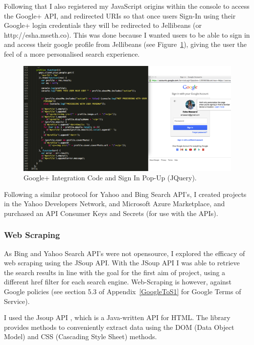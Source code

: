 \documentclass[a4paper, 11pt]{article}
\begin{document}
Following that I also registered my JavaScript origins within the console to access the Google+ API, and redirected URIs so that once users Sign-In using their Google+ login credentials they will be redirected to Jellibeans (or http://esha.mseth.co). This was done because I wanted users to be able to sign in and access their google profile from Jellibeans (see Figure~\ref{GoogleSignInPage}), giving the user the feel of a more personalised search experience. 

\begin{figure}[H]
\begin{center}
\includegraphics[scale=0.65]{aboutme}
\end{center}
\caption{Google+ Integration Code and Sign In Pop-Up (JQuery).}
\label{GoogleSignInPage}
\end{figure}

Following a similar protocol for Yahoo and Bing Search API's, I created projects in the Yahoo Developers Network, and Microsoft Azure Marketplace, and purchased an API Consumer Keys and Secrets (for use with the APIs). 

\subsubsection{Web Scraping}
As Bing and Yahoo Search API's were not opensource, I explored the efficacy of web scraping using the JSoup API. With the JSoup API I was able to retrieve the search results in line with the goal for the first aim of project, using a different href filter for each search engine. Web-Scraping is however, against Google policies (see section 5.3 of Appendix~\ref{GoogleToS1} for Google Terms of Service). 

\vspace{5mm}
I used the Jsoup API \cite{jsoup}, which is a Java-written API for HTML. The library provides methods to conveniently extract data using the DOM (Data Object Model) and CSS (Cascading Style Sheet) methods. 
\end{document}
